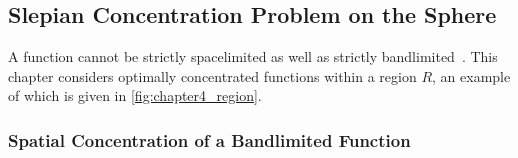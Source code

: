 \subsection{Slepian Concentration Problem on the Sphere}\label{sec:chapter4_slepian_concentration_problem}

A function cannot be strictly spacelimited as well as strictly bandlimited~\cite{Slepian1961,Slepian1983}.
This chapter considers optimally concentrated functions within a region \(R\), an example of which is given in \cref{fig:chapter4_region}.



\subsubsection{Spatial Concentration of a Bandlimited Function}

